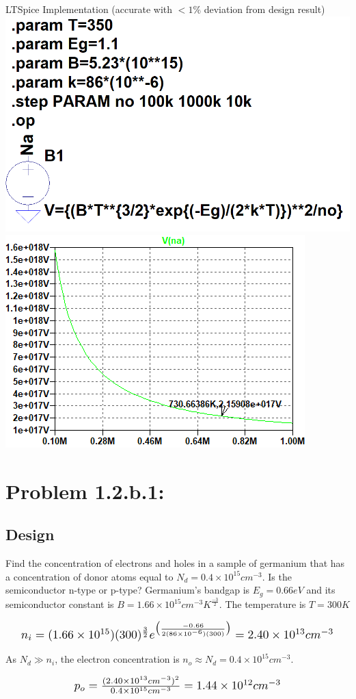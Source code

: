 \documentclass[12pt,letterpaper,titlepage]{article}
\begin{document}
\begin{raggedright}
\begin{center}
LTSpice Implementation (accurate with $< 1\%$ deviation from design result)
\includegraphics[width=.4\textwidth, height=\textheight, keepaspectratio=true]{ds1b}
\includegraphics[width=.4\textwidth, height=\textheight, keepaspectratio=true]{ds1c}
\end{center}

\clearpage
\section{Problem 1.2.b.1: }
\subsection{Design}
Find the concentration of electrons and holes in a sample of germanium
that has a concentration of donor atoms equal to $N_d = 0.4 \times 10^{15} cm^{−3}$. Is the semiconductor n-type or p-type? Germanium's bandgap is $E_g = 0.66eV$ and its semiconductor constant is $B = 1.66 \times 10^{15} cm^{-3}K^{\frac{-3}{2}}$. The temperature is $T = 300K$

\begin{equation}\scalebox{1.25}{
$
n_i = (1.66\times 10^{15})(300)^{\frac{3}{2}}e^{
	\big(\frac{-0.66}{
		2(86\times 10^{-6})(300)
	}\big)
	} 
	= 2.40\times 10^{13} cm^{-3}
$
}
\end{equation}

As $N_d \gg n_i$, the electron concentration is $n_o \approx N_d = 0.4 \times 10^{15} cm^{-3}$.


\begin{equation}\scalebox{1.25}{
$
p_o	= \frac{
	(2.40\times 10^{13} cm^{-3})^2
}{
	0.4 \times 10^{15} cm^{-3}
}
	= 1.44 \times 10^{12} cm^{-3}
$
}
\end{equation}


\end{raggedright}
\end{document}

